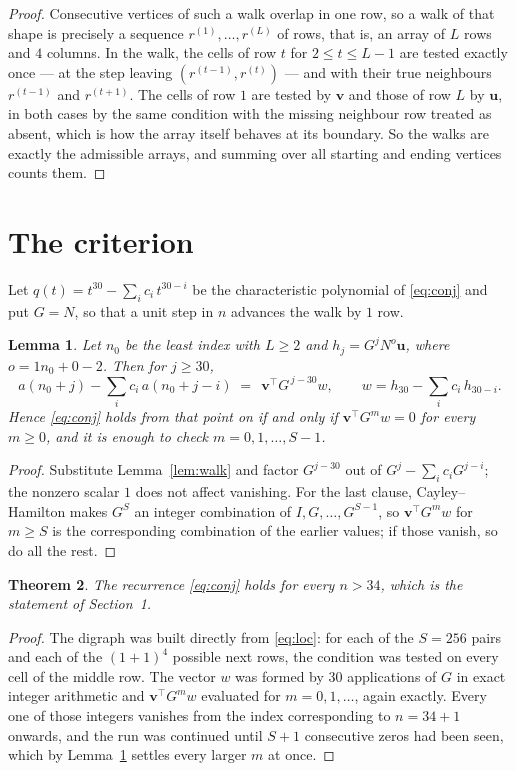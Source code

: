 \documentclass[11pt,a4paper]{article}
\theoremstyle{plain}
\newtheorem{theorem}{Theorem}
\newtheorem{lemma}[theorem]{Lemma}
\theoremstyle{definition}
\begin{document}
\begin{proof}
Consecutive vertices of such a walk overlap in one row, so a walk of that shape is
precisely a sequence $r^{(1)},\dots,r^{(L)}$ of rows, that is, an array of $L$ rows
and $4$ columns. In the walk, the cells of row $t$ for $2\le t\le L-1$ are tested
exactly once --- at the step leaving $(r^{(t-1)},r^{(t)})$ --- and with their true
neighbours $r^{(t-1)}$ and $r^{(t+1)}$. The cells of row $1$ are tested by
$\mathbf{v}$ and those of row $L$ by $\mathbf{u}$, in both cases by the same condition
with the missing neighbour row treated as absent, which is how the array itself behaves at
its boundary. So the walks are exactly the admissible arrays, and summing over all starting
and ending vertices counts them.
\end{proof}

\section{The criterion}

Let $q(t)=t^{30}-\sum_i c_i\,t^{30-i}$ be the characteristic polynomial of
\eqref{eq:conj} and put $G=N$, so that a unit step in $n$ advances the walk by
$1$ row.

\begin{lemma}\label{lem:crit}
Let $n_0$ be the least index with $L\ge2$ and $h_j=G^{j}N^{o}\mathbf{u}$, where
$o=1n_0+0-2$. Then for $j\ge30$,
\[
a(n_0+j)-\sum_i c_i\,a(n_0+j-i)\;=\;\,\mathbf{v}^{\!\top}G^{\,j-30}w,
\qquad w=h_{30}-\sum_i c_i\,h_{30-i} .
\]
Hence \eqref{eq:conj} holds from that point on if and only if
$\mathbf{v}^{\!\top}G^{m}w=0$ for every $m\ge0$, and it is enough to check
$m=0,1,\dots,S-1$.
\end{lemma}

\begin{proof}
Substitute Lemma~\ref{lem:walk} and factor $G^{j-30}$ out of
$G^{j}-\sum_ic_iG^{j-i}$; the nonzero scalar $1$ does not affect
vanishing. For the last clause, Cayley--Hamilton makes $G^{S}$ an integer combination of
$I,G,\dots,G^{S-1}$, so $\mathbf{v}^{\!\top}G^{m}w$ for $m\ge S$ is the corresponding
combination of the earlier values; if those vanish, so do all the rest.
\end{proof}

\begin{theorem}
The recurrence \eqref{eq:conj} holds for every $n>34$, which is the statement of
Section~1.
\end{theorem}

\begin{proof}
The digraph was built directly from \eqref{eq:loc}: for each of the $S=256$ pairs and each
of the $(1+1)^{4}$ possible next rows, the condition was tested on every cell of
the middle row. The vector $w$ was formed by $30$ applications of $G$ in exact integer
arithmetic and $\mathbf{v}^{\!\top}G^{m}w$ evaluated for $m=0,1,\dots$, again exactly.
Every one of those integers vanishes from the index corresponding to $n=34+1$ onwards,
and the run was continued until $S+1$ consecutive zeros had been seen, which by
Lemma~\ref{lem:crit} settles every larger $m$ at once.
\end{proof}
\end{document}
